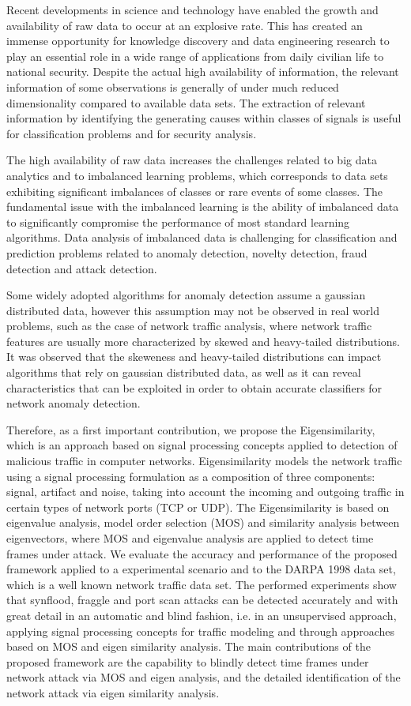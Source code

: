 {Recent developments in science and technology have enabled the growth and availability of raw data to occur at an explosive rate. This has created an immense opportunity for knowledge discovery and data engineering research to play an essential role in a wide range of applications from daily civilian life to national security. Despite the actual high availability of information, the relevant information of some observations is generally of under much reduced dimensionality compared to available data sets. The extraction of relevant information by identifying the generating causes within classes of signals is useful for classification problems and for security analysis. 

The high availability of raw data increases the challenges related to big data analytics and to imbalanced learning problems, which corresponds to data sets exhibiting significant imbalances of classes or rare events of some classes. The fundamental issue with the imbalanced learning is the ability of imbalanced data to significantly compromise the performance of most standard learning algorithms. Data analysis of imbalanced data is challenging for classification and prediction problems related to anomaly detection, novelty detection, fraud detection and attack detection.

Some widely adopted algorithms for anomaly detection assume a gaussian distributed data, however this assumption may not be observed in real world problems, such as the case of network traffic analysis, where network traffic features are usually more characterized by skewed and heavy-tailed distributions. It was observed that the skeweness and heavy-tailed distributions can impact algorithms that rely on gaussian distributed data, as well as it can reveal characteristics that can be exploited in order to obtain accurate classifiers for network anomaly detection.

Therefore, as a first important contribution, we propose the Eigensimilarity, which is an approach based on signal processing concepts applied to detection of malicious traffic in computer networks. Eigensimilarity models the network traffic using a signal processing formulation as a composition of three components: signal, artifact and noise, taking into account the incoming and outgoing traffic in certain types of network ports (TCP or UDP). The Eigensimilarity is based on eigenvalue analysis, model order selection (MOS) and similarity analysis between eigenvectors, where MOS and eigenvalue analysis are applied to detect time frames under attack. We evaluate the accuracy and performance of the proposed framework applied to a experimental scenario and to the DARPA 1998 data set, which is a well known network traffic data set. The performed experiments show that synflood, fraggle and port scan attacks can be detected accurately and with great detail in an automatic and blind fashion, i.e. in an unsupervised approach, applying signal processing concepts for traffic modeling and through approaches based on MOS and eigen similarity analysis. The main contributions of the proposed framework are the capability to blindly detect time frames under network attack via MOS and eigen analysis, and the detailed identification of the network attack via eigen similarity analysis.


}
